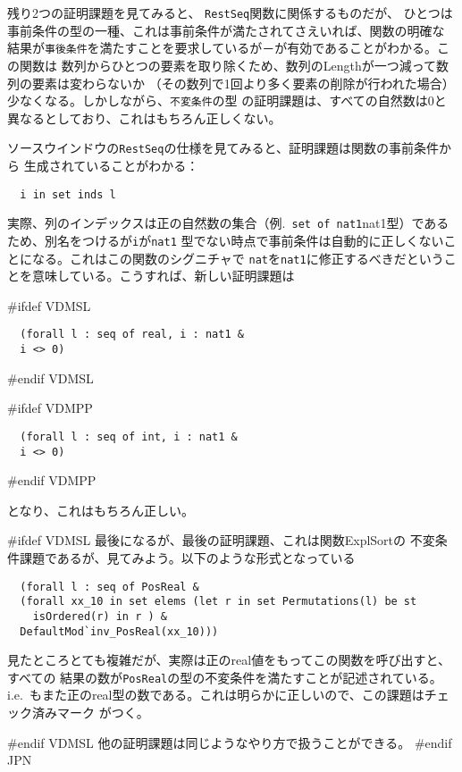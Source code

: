 \documentclass[\pformat,12pt]{article}
\newcommand{\aaa}{\tt }
\newcommand{\guicmd}[1]{{\sf #1}}
\newcommand{\guicmd}[1]{{\gt #1}}
\begin{document}
残り2つの証明課題を見てみると、
{\aaa RestSeq}関数に関係するものだが、
ひとつは事前条件の型の一種、これは事前条件が満たされてさえいれば、関数の明確な
結果が{\aaa 事後条件}を満たすことを要求しているが－が有効であることがわかる。この関数は
数列からひとつの要素を取り除くため、数列のLengthが一つ減って数列の要素は変わらないか
（その数列で1回より多く要素の削除が行われた場合）少なくなる。しかしながら、{\aaa 不変条件}の型
の証明課題は、すべての自然数は0と異なるとしており、これはもちろん正しくない。

\guicmd{ソースウインドウ}の{\aaa RestSeq}の仕様を見てみると、証明課題は関数の事前条件から
生成されていることがわかる：

\begin{verbatim}
  i in set inds l
\end{verbatim}

実際、列のインデックスは正の自然数の集合（例.\ \verb+set of nat1+nat1型）であるため、別名をつけるが{\aaa i}が{\aaa nat1}
型でない時点で事前条件は自動的に正しくないことになる。これはこの関数のシグニチャで
{\aaa nat}を{\aaa nat1}に修正するべきだということを意味している。こうすれば、新しい証明課題は

#ifdef VDMSL
\begin{verbatim}
  (forall l : seq of real, i : nat1 &
  i <> 0)
\end{verbatim}
#endif VDMSL

#ifdef VDMPP
\begin{verbatim}
  (forall l : seq of int, i : nat1 &
  i <> 0)
\end{verbatim}
#endif VDMPP

となり、これはもちろん正しい。

#ifdef VDMSL
最後になるが、最後の証明課題、これは関数\guicmd{ExplSort}の
不変条件課題であるが、見てみよう。以下のような形式となっている

\begin{verbatim}
  (forall l : seq of PosReal &
  (forall xx_10 in set elems (let r in set Permutations(l) be st 
    isOrdered(r) in r ) &
  DefaultMod`inv_PosReal(xx_10)))
\end{verbatim}

見たところとても複雑だが、実際は正のreal値をもってこの関数を呼び出すと、すべての
結果の数が{\aaa PosReal}の型の不変条件を満たすことが記述されている。i.e.\ 
もまた正のreal型の数である。これは明らかに正しいので、この課題はチェック済みマーク
がつく。

#endif VDMSL
他の証明課題は同じようなやり方で扱うことができる。
#endif JPN
\end{document}
